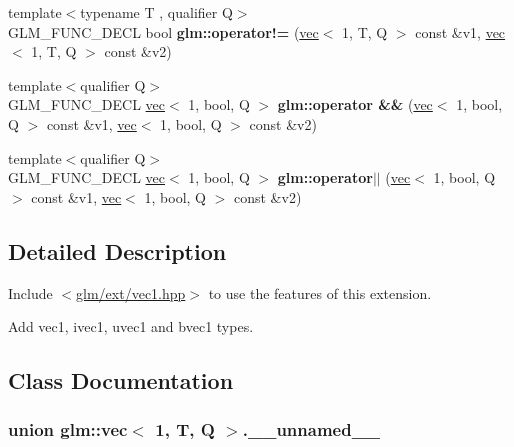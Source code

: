 \begin{DoxyCompactItemize}
\item 
\mbox{\label{group__ext__vec1_gadc81ac3efb2cc1678cb7ebe126d2e26d}} 
{\footnotesize template$<$typename T , qualifier Q$>$ }\\G\+L\+M\+\_\+\+F\+U\+N\+C\+\_\+\+D\+E\+CL bool {\bfseries glm\+::operator!=} (\hyperlink{structglm_1_1vec}{vec}$<$ 1, T, Q $>$ const \&v1, \hyperlink{structglm_1_1vec}{vec}$<$ 1, T, Q $>$ const \&v2)
\item 
\mbox{\label{group__ext__vec1_ga5836cbb5b58489de3281dc7460e4f2ce}} 
{\footnotesize template$<$qualifier Q$>$ }\\G\+L\+M\+\_\+\+F\+U\+N\+C\+\_\+\+D\+E\+CL \hyperlink{structglm_1_1vec}{vec}$<$ 1, bool, Q $>$ {\bfseries glm\+::operator \&\&} (\hyperlink{structglm_1_1vec}{vec}$<$ 1, bool, Q $>$ const \&v1, \hyperlink{structglm_1_1vec}{vec}$<$ 1, bool, Q $>$ const \&v2)
\item 
\mbox{\label{group__ext__vec1_ga121908a337ee4ab94414dfd4f3518d47}} 
{\footnotesize template$<$qualifier Q$>$ }\\G\+L\+M\+\_\+\+F\+U\+N\+C\+\_\+\+D\+E\+CL \hyperlink{structglm_1_1vec}{vec}$<$ 1, bool, Q $>$ {\bfseries glm\+::operator$\vert$$\vert$} (\hyperlink{structglm_1_1vec}{vec}$<$ 1, bool, Q $>$ const \&v1, \hyperlink{structglm_1_1vec}{vec}$<$ 1, bool, Q $>$ const \&v2)
\end{DoxyCompactItemize}


\subsection{Detailed Description}
Include $<$\hyperlink{ext_2vec1_8hpp}{glm/ext/vec1.\+hpp}$>$ to use the features of this extension.

Add vec1, ivec1, uvec1 and bvec1 types. 

\subsection{Class Documentation}
\label{unionglm_1_1vec_3_011_00_01T_00_01Q_01_4_8____unnamed____}
\subsubsection{union glm\+:\+:vec$<$ 1, T, Q $>$.\+\_\+\+\_\+unnamed\+\_\+\+\_\+}


